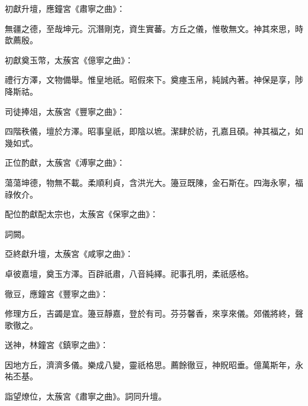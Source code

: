 \begin{pinyinscope}
 初獻升壇，應鐘宮《肅寧之曲》：



 無疆之德，至哉坤元。沉潛剛克，資生實蕃。方丘之儀，惟敬無文。神其來思，時歆薦殷。



 初獻奠玉幣，太蔟宮《億寧之曲》：



 禮行方澤，文物備舉。惟皇地祇。昭假來下。奠瘞玉帛，純誠內著。神保是享，陟降斯祜。



 司徒捧俎，太蔟宮《豐寧之曲》：



 四階秩儀，壇於方澤。昭事皇祇，即陰以墌。潔肆於祊，孔嘉且碩。神其福之，如幾如式。



 正位酌獻，太蔟宮《溥寧之曲》：



 蕩蕩坤德，物無不載。柔順利貞，含洪光大。籩豆既陳，金石斯在。四海永寧，福祿攸介。



 配位酌獻配太宗也，太蔟宮《保寧之曲》：



 詞闕。



 亞終獻升壇，太蔟宮《咸寧之曲》：



 卓彼嘉壇，奠玉方澤。百辟祇肅，八音純繹。祀事孔明，柔祇感格。



 徹豆，應鐘宮《豐寧之曲》：



 修理方丘，吉蠲是宜。籩豆靜嘉，登於有司。芬芬馨香，來享來儀。郊儀將終，聲歌徹之。



 送神，林鐘宮《鎮寧之曲》：



 因地方丘，濟濟多儀。樂成八變，靈祇格思。薦餘徹豆，神貺昭垂。億萬斯年，永祐丕基。



 詣望燎位，太蔟宮《肅寧之曲》。詞同升壇。



\end{pinyinscope}